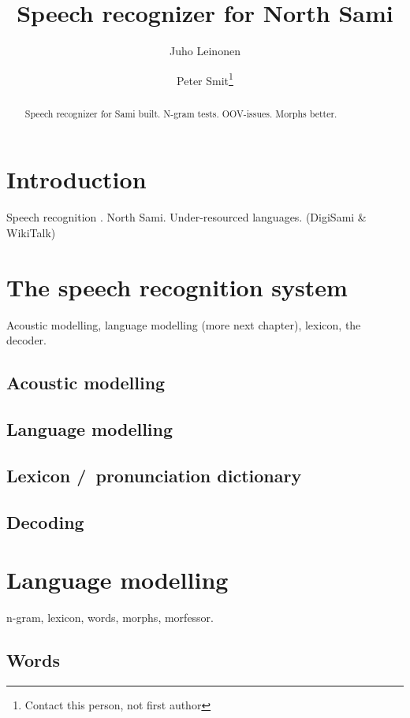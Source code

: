 \documentclass[10pt,b5paper]{article}
\begin{document}
\title{Speech recognizer for North Sami} \author{Juho Leinonen \and Peter Smit\footnote{Contact this person, not first author}}  \maketitle

\begin{abstract} Speech recognizer for Sami built. N-gram tests. OOV-issues. Morphs better. \end{abstract}

\section{Introduction}

Speech recognition \cite{huang2001spoken}. North Sami. Under-resourced languages. (DigiSami \& WikiTalk)

\section{The speech recognition system}

Acoustic modelling, language modelling (more next chapter), lexicon, the decoder.

\subsection{Acoustic modelling}

\subsection{Language modelling}

\subsection{Lexicon /\ pronunciation dictionary}

\subsection{Decoding}


\section{Language modelling}

n-gram, lexicon, words, morphs, morfessor. 


\subsection{Words}
\end{document}
